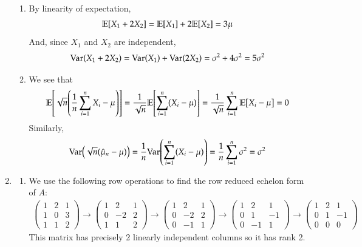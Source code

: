 \documentclass[12pt]{article}
\theoremstyle{definitionstyle}
\newcommand{\E}{\mathbb{E}\qty}
\newcommand{\Var}{\mathrm{Var}\qty}
\begin{document}
\begin{enumerate}[leftmargin=\labelsep]
\begin{enumerate}
			\item By linearity of expectation, 
			\begin{align*}
				\E[X_1 + 2X_2] = \E[X_1] + 2\E[X_2] = 3\mu
			\end{align*}
			And, since $X_1$ and $X_2$ are independent,
			\begin{align*}
				\Var(X_1+2X_2) = \Var(X_1) + \Var(2X_2) = \sigma^2 + 4\sigma^2 = 5\sigma^2
			\end{align*}
			
			\item We see that
			\begin{align*}
				\E[\sqrt{n}\qty(\frac 1n \sum_{i=1}^n X_i - \mu)] = \frac{1}{\sqrt{n}} \E[\sum_{i=1}^n (X_i-\mu)] = \frac{1}{\sqrt{n}} \sum_{i=1}^n \E[X_i-\mu] = 0
			\end{align*}
			Similarly,
			\begin{align*}
				\Var(\sqrt{n}(\hat \mu_n - \mu)) = \frac{1}{n}\Var(\sum_{i=1}^n (X_i-\mu)) = \frac{1}{n} \sum_{i=1}^n \sigma^2 = \sigma^2
			\end{align*}
		\end{enumerate}
		
		\item \begin{enumerate}
			\item We use the following row operations to find the row reduced echelon form of $A$:
			\begin{align*}
				\begin{pmatrix}
				1 & 2 & 1 \\
				1 & 0 & 3 \\
				1 & 1 & 2
				\end{pmatrix}
				\to
				\begin{pmatrix}
				1 & 2 & 1 \\
				0 & -2 & 2 \\
				1 & 1 & 2
				\end{pmatrix} 
				\to
				\begin{pmatrix}
				1 & 2 & 1 \\
				0 & -2 & 2 \\
				0 & -1 & 1
				\end{pmatrix} 
				\to
				\begin{pmatrix}
				1 & 2 & 1 \\
				0 & 1 & -1 \\
				0 & -1 & 1
				\end{pmatrix} 
				\to
				\begin{pmatrix}
				1 & 2 & 1 \\
				0 & 1 & -1 \\
				0 & 0 & 0
				\end{pmatrix}
			\end{align*}
			This matrix has precisely 2 linearly independent columns so it has rank 2.


\end{enumerate}
\end{enumerate}
\end{document}
